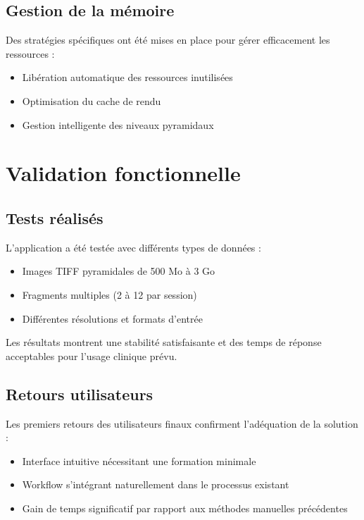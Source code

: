 \documentclass[11pt,a4paper]{report}
\begin{document}
\subsection{Gestion de la mémoire}

Des stratégies spécifiques ont été mises en place pour gérer efficacement les ressources :

\begin{itemize}
\item Libération automatique des ressources inutilisées
\item Optimisation du cache de rendu
\item Gestion intelligente des niveaux pyramidaux
\end{itemize}

\section{Validation fonctionnelle}

\subsection{Tests réalisés}

L'application a été testée avec différents types de données :

\begin{itemize}
\item Images TIFF pyramidales de 500 Mo à 3 Go
\item Fragments multiples (2 à 12 par session)
\item Différentes résolutions et formats d'entrée
\end{itemize}

Les résultats montrent une stabilité satisfaisante et des temps de réponse acceptables pour l'usage clinique prévu.

\subsection{Retours utilisateurs}

Les premiers retours des utilisateurs finaux confirment l'adéquation de la solution :

\begin{itemize}
\item Interface intuitive nécessitant une formation minimale
\item Workflow s'intégrant naturellement dans le processus existant
\item Gain de temps significatif par rapport aux méthodes manuelles précédentes
\end{itemize}
\end{document}
